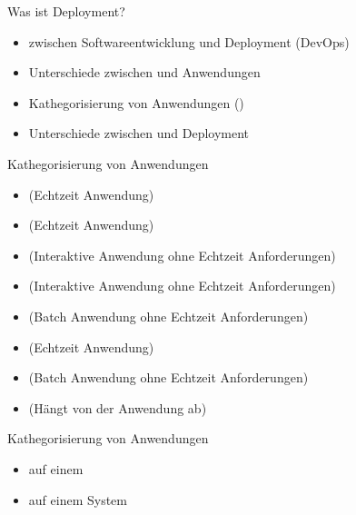 \documentclass[12pt, aspectratio=169, usepdftitle=false]{beamer}
\begin{document}
\begin{frame}[fragile]{Was ist Deployment?}
	\begin{itemize}
		\item \pause {} zwischen Softwareentwicklung und Deployment (DevOps)
		\item \pause Unterschiede zwischen  und  Anwendungen
		\item \pause Kathegorisierung von Anwendungen ()
		\item \pause Unterschiede zwischen  und  Deployment
	\end{itemize}
\end{frame}

\begin{frame}[fragile]{Kathegorisierung von Anwendungen}
	\begin{itemize}
		\item \pause {} \pause (Echtzeit Anwendung)
		\item \pause {} \pause (Echtzeit Anwendung)
		\item \pause {} \pause (Interaktive Anwendung ohne Echtzeit Anforderungen)
		\item \pause {} \pause (Interaktive Anwendung ohne Echtzeit Anforderungen)
		\item \pause {} \pause (Batch Anwendung ohne Echtzeit Anforderungen)
		\item \pause {} \pause (Echtzeit Anwendung)
		\item \pause {} \pause (Batch Anwendung ohne Echtzeit Anforderungen)
		\item \pause {} \pause (Hängt von der Anwendung ab)
	\end{itemize}
\end{frame}

\begin{frame}[fragile]{Kathegorisierung von Anwendungen}
	\begin{itemize}
		\item \pause auf einem 
		\item \pause auf einem  System
	\end{itemize}
\end{frame}
\end{document}
